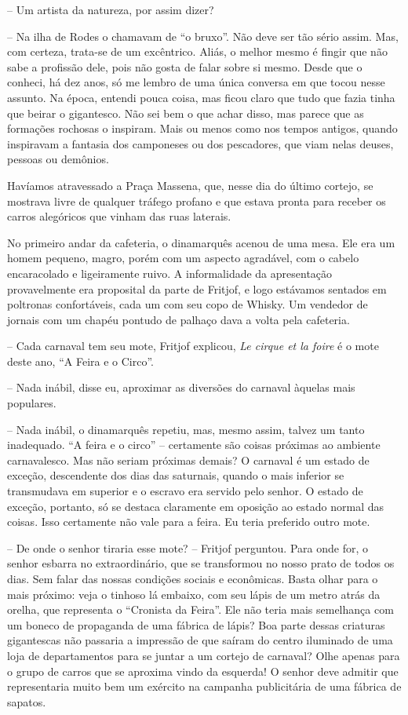 -- Um artista da natureza, por assim dizer?

-- Na ilha de Rodes o chamavam de ``o bruxo''. Não deve ser tão sério
assim. Mas, com certeza, trata-se de um excêntrico. Aliás, o melhor
mesmo é fingir que não sabe a profissão dele, pois não gosta de falar
sobre si mesmo. Desde que o conheci, há dez anos, só me lembro de uma
única conversa em que tocou nesse assunto. Na época, entendi pouca
coisa, mas ficou claro que tudo que fazia tinha que beirar o gigantesco.
Não sei bem o que achar disso, mas parece que as formações rochosas o
inspiram. Mais ou menos como nos tempos antigos, quando inspiravam a
fantasia dos camponeses ou dos pescadores, que viam nelas deuses,
pessoas ou demônios.

Havíamos atravessado a Praça Massena, que, nesse dia do último cortejo,
se mostrava livre de qualquer tráfego profano e que estava pronta para
receber os carros alegóricos que vinham das ruas laterais.

No primeiro andar da cafeteria, o dinamarquês acenou de uma mesa. Ele
era um homem pequeno, magro, porém com um aspecto agradável, com o
cabelo encaracolado e ligeiramente ruivo. A informalidade da
apresentação provavelmente era proposital da parte de Fritjof, e logo
estávamos sentados em poltronas confortáveis, cada um com seu copo de
Whisky. Um vendedor de jornais com um chapéu pontudo de palhaço dava a
volta pela cafeteria.

-- Cada carnaval tem seu mote, Fritjof explicou, \emph{Le cirque et la
foire} é o mote deste ano, ``A Feira e o Circo''.

-- Nada inábil, disse eu, aproximar as diversões do carnaval àquelas
mais populares.

-- Nada inábil, o dinamarquês repetiu, mas, mesmo assim, talvez um tanto
inadequado. ``A feira e o circo'' -- certamente são coisas próximas ao
ambiente carnavalesco. Mas não seriam próximas demais? O carnaval é um
estado de exceção, descendente dos dias das saturnais, quando o mais
inferior se transmudava em superior e o escravo era servido pelo senhor.
O estado de exceção, portanto, só se destaca claramente em oposição ao
estado normal das coisas. Isso certamente não vale para a feira. Eu
teria preferido outro mote.

-- De onde o senhor tiraria esse mote? -- Fritjof perguntou. Para onde
for, o senhor esbarra no extraordinário, que se transformou no nosso
prato de todos os dias. Sem falar das nossas condições sociais e
econômicas. Basta olhar para o mais próximo: veja o tinhoso lá embaixo,
com seu lápis de um metro atrás da orelha, que representa o ``Cronista
da Feira''. Ele não teria mais semelhança com um boneco de propaganda de
uma fábrica de lápis? Boa parte dessas criaturas gigantescas não
passaria a impressão de que saíram do centro iluminado de uma loja de
departamentos para se juntar a um cortejo de carnaval? Olhe apenas para
o grupo de carros que se aproxima vindo da esquerda! O senhor deve
admitir que representaria muito bem um exército na campanha publicitária
de uma fábrica de sapatos.

